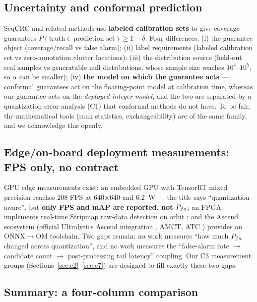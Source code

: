 \subsection{Uncertainty and conformal prediction}
\label{sec:rw-conformal}

SeqCRC \citep{seqcrc} and related methods use \textbf{labeled calibration sets} to give coverage guarantees $P(\text{truth}\in\text{prediction set})\ge1-\delta$.
Four differences: (i) the guarantee object (coverage/recall vs false alarm); (ii) label requirements (labeled calibration set vs zero-annotation clutter locations); (iii) the distribution source (held-out real samples vs generatable null distributions, whose sample size reaches $10^4$--$10^5$, so $\alpha$ can be smaller); (iv) \textbf{the model on which the guarantee acts} --- conformal guarantees act on the floating-point model at calibration time, whereas our guarantee acts on the \emph{deployed integer model}, and the two are separated by a quantization-error analysis (C1) that conformal methods do not have.
To be fair, the mathematical tools (rank statistics, exchangeability) are of the same family, and we acknowledge this openly.

\subsection{Edge/on-board deployment measurements: FPS only, no contract}
\label{sec:rw-edge}

GPU edge measurements exist: an embedded GPU with TensorRT mixed precision reaches 208 FPS at 640$\times$640 and 6.2~W \citep{jetson_sar} --- the title says ``quantization-aware'', but \textbf{only FPS and mAP are reported, not $P_{fa}$}; an FPGA implements real-time Stripmap raw-data detection on orbit \citep{fpgasar}; and the Ascend ecosystem (official Ultralytics Ascend integration \citep{ultralytics_ascend}, AMCT, ATC \citep{amct_atc}) provides an ONNX$\to$OM toolchain.
Two gaps remain: no work measures ``how much $P_{fa}$ changed across quantization'', and no work measures the ``false-alarm rate $\to$ candidate count $\to$ post-processing tail latency'' coupling.
Our C3 measurement groups (Sections~\ref{sec:e2}--\ref{sec:e7}) are designed to fill exactly these two gaps.

\subsection{Summary: a four-column comparison}
\label{sec:rw-summary}

